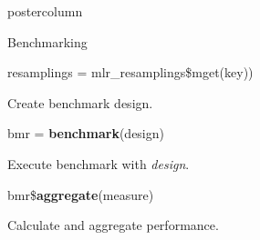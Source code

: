 \documentclass{beamer}
\begin{document}
\begin{frame}[fragile]{}
\begin{columns}
\begin{column}{.245\textwidth}
\begin{beamercolorbox}[center]{postercolumn}
\begin{minipage}{.98\textwidth}
{\begin{myblock}{Benchmarking}
\begin{codeboxmultiline}[width=21.95cm]
								\hspace*{1ex}resamplings = mlr\_resamplings\$mget(key))
							\end{codeboxmultiline}
							Create benchmark design.
							\\
							\begin{codebox}
								bmr = \textbf{benchmark}(design)
							\end{codebox}
							Execute benchmark with \textit{design}.
							\\
							\begin{codebox}
								bmr\$\textbf{aggregate}(measure)
							\end{codebox}
							Calculate and aggregate performance.
						\end{myblock}\vfill
					}
				\end{minipage}
			\end{beamercolorbox}
		\end{column}
	\end{columns}
\end{frame}
\end{document}
